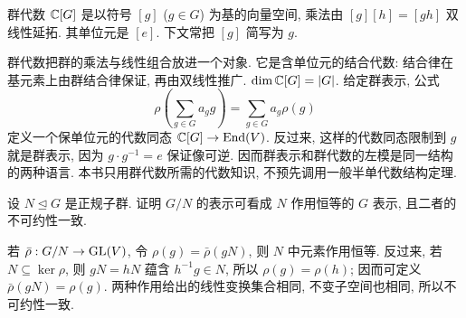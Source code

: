\begin{definition}
群代数 $\mathbb C[G]$ 是以符号 $[g]$ ($g\in G$) 为基的向量空间, 乘法由 $[g][h]=[gh]$ 双线性延拓. 其单位元是 $[e]$. 下文常把 $[g]$ 简写为 $g$.
\end{definition}
群代数把群的乘法与线性组合放进一个对象. 它是含单位元的结合代数: 结合律在基元素上由群结合律保证, 再由双线性推广. $\dim\mathbb C[G]=|G|$. 给定群表示, 公式
\[
 \rho\left(\sum_{g\in G}a_g g\right)=\sum_{g\in G}a_g\rho(g)
\]
定义一个保单位元的代数同态 $\mathbb C[G]\to\operatorname{End}(V)$. 反过来, 这样的代数同态限制到 $g$ 就是群表示, 因为 $g\cdot g^{-1}=e$ 保证像可逆. 因而群表示和群代数的左模是同一结构的两种语言. 本书只用群代数所需的代数知识, 不预先调用一般半单代数结构定理.

\begin{exercise}
设 $N\trianglelefteq G$ 是正规子群. 证明 $G/N$ 的表示可看成 $N$ 作用恒等的 $G$ 表示, 且二者的不可约性一致.
\end{exercise}
\begin{solution}
若 $\bar\rho:G/N\to\operatorname{GL}(V)$, 令 $\rho(g)=\bar\rho(gN)$, 则 $N$ 中元素作用恒等. 反过来, 若 $N\subseteq\ker\rho$, 则 $gN=hN$ 蕴含 $h^{-1}g\in N$, 所以 $\rho(g)=\rho(h)$; 因而可定义 $\bar\rho(gN)=\rho(g)$. 两种作用给出的线性变换集合相同, 不变子空间也相同, 所以不可约性一致.
\end{solution}
